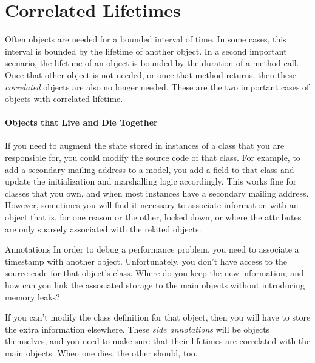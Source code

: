 \section{Correlated Lifetimes}
\label{sec:correlated-lifetime-pattern}


Often objects are needed for a bounded interval of time. In some cases, this
interval is bounded by the lifetime of another object. In a second important
scenario, the lifetime of an object is bounded by the duration of a method call.
Once that other object is not needed, or once that method returns, then these
\emph{correlated} objects are also no longer needed. These are the two important
cases of objects with correlated lifetime.

\paragraph{Objects that Live and Die Together}
\label{sec:correlated-lifetime-1}

If you need to augment the state stored in instances of a class that you are
responsible for, you could modify the source code of that class. For example, to
add a secondary mailing address to a  model, you add a field to
that class and update the initialization and marshalling logic accordingly. This
works fine for classes that you own, and when most  instances have
a secondary mailing address. However, sometimes you will find it necessary to
associate information with an object that is, for one reason or the other, locked down, or
where the attributes are only sparsely associated with the related objects.

\begin{example}{Annotations}
In order to debug a performance problem, you need to associate a timestamp with
another object. Unfortunately, you don't have access to the source code for
that object's class. Where do you keep the new information, and how can you
link the associated storage to the main objects without introducing memory
leaks?
\end{example}

If you can't modify the class definition for that object, then you will have to
store the extra information elsewhere. These \emph{side annotations} will be objects themselves, and you need to make sure that their
lifetimes are correlated with the main objects. When one dies, the other
should, too.

